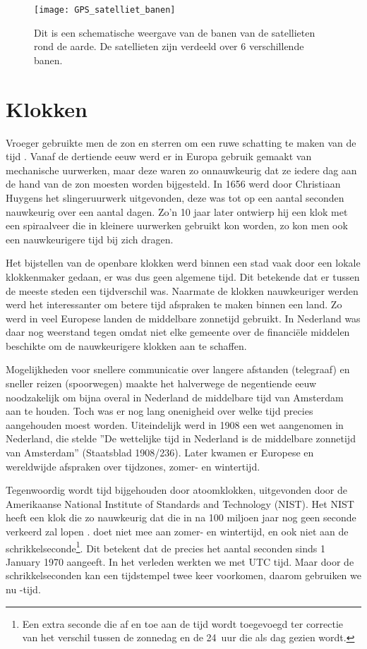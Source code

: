 \begin{figure}
    \centering
    \texttt{[image: GPS\_satelliet\_banen]}
    \caption{Dit is een schematische weergave van de banen van de \gps
    satellieten rond de aarde. De satellieten zijn verdeeld over 6
    verschillende banen.}
    \label{fig:GPS_satelliet_banen}
\end{figure}


\section{Klokken}

Vroeger gebruikte men de zon en sterren om een ruwe schatting te maken
van de tijd \cite{gent2003wet}. Vanaf de dertiende eeuw werd er in
Europa gebruik gemaakt van mechanische uurwerken, maar deze waren zo
onnauwkeurig dat ze iedere dag aan de hand van de zon moesten worden
bijgesteld. In 1656 werd door Christiaan Huygens het slingeruurwerk
uitgevonden, deze was tot op een aantal seconden nauwkeurig over een
aantal dagen. Zo'n 10 jaar later ontwierp hij een klok met een
spiraalveer die in kleinere uurwerken gebruikt kon worden, zo kon men
ook een nauwkeurigere tijd bij zich dragen.

Het bijstellen van de openbare klokken werd binnen een stad vaak door
een lokale klokkenmaker gedaan, er was dus geen algemene tijd. Dit
betekende dat er tussen de meeste steden een tijdverschil was. Naarmate
de klokken nauwkeuriger werden werd het interessanter om betere tijd
afspraken te maken binnen een land. Zo werd in veel Europese landen de
middelbare zonnetijd gebruikt. In Nederland was daar nog weerstand tegen
omdat niet elke gemeente over de financiële middelen beschikte om de
nauwkeurigere klokken aan te schaffen.

Mogelijkheden voor snellere communicatie over langere afstanden
(telegraaf) en sneller reizen (spoorwegen) maakte het halverwege de
negentiende eeuw noodzakelijk om bijna overal in Nederland de middelbare
tijd van Amsterdam aan te houden. Toch was er nog lang onenigheid over
welke tijd precies aangehouden moest worden. Uiteindelijk werd in 1908
een wet aangenomen in Nederland, die stelde ''De wettelijke tijd in
Nederland is de middelbare zonnetijd van Amsterdam'' (Staatsblad
1908/236). Later kwamen er Europese en wereldwijde afspraken over
tijdzones, zomer- en wintertijd.

Tegenwoordig wordt tijd bijgehouden door atoomklokken, uitgevonden door
de Amerikaanse National Institute of Standards and Technology (NIST).
Het NIST heeft een klok die zo nauwkeurig dat die in na 100 miljoen jaar
nog geen seconde verkeerd zal lopen \cite{nist2013ces}. \gps doet niet
mee aan zomer- en wintertijd, en ook niet aan de
schrikkelseconde\footnote{Een extra seconde die af en toe aan de tijd
wordt toegevoegd ter correctie van het verschil tussen de zonnedag en de
\SI{24}{uur} die als dag gezien wordt.}. Dit betekent dat de \gps
precies het aantal seconden sinds 1 January 1970 aangeeft. In het
verleden werkten we met UTC tijd. Maar door de schrikkelseconden kan een
tijdstempel twee keer voorkomen, daarom gebruiken we nu \gps-tijd.


